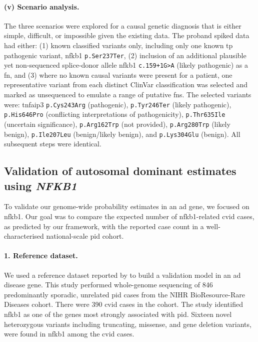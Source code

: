 \paragraph{(v) Scenario analysis.}
The three scenarios were explored for a causal genetic diagnosis that is either simple, difficult, or impossible given the existing data.
The proband spiked data had either:
(1) known classified variants only, including only one known \ac{tp} pathogenic variant, \ac{nfkb1}  \texttt{p.Ser237Ter}, 
(2) inclusion of an additional plausible yet non-sequenced splice‑donor allele \ac{nfkb1}  \texttt{c.159+1G{\small\textgreater}A} (likely pathogenic) as a \ac{fn}, and 
(3) where no known causal variants were present for a patient, one representative variant from each distinct ClinVar classification was selected and marked as unsequenced to emulate a range of putative \acp{fn}. The selected variants were: \ac{tnfaip3} \texttt{p.Cys243Arg} (pathogenic), \texttt{p.Tyr246Ter} (likely pathogenic), \texttt{p.His646Pro} (conflicting interpretations of pathogenicity), \texttt{p.Thr635Ile} (uncertain significance), \texttt{p.Arg162Trp} (not provided), \texttt{p.Arg280Trp} (likely benign), \texttt{p.Ile207Leu} (benign/likely benign), and \texttt{p.Lys304Glu} (benign). 
All subsequent steps were identical.

\subsection{Validation of autosomal dominant estimates using \textit{NFKB1}}

To validate our genome-wide probability estimates in an \ac{ad} gene, we focused on \ac{nfkb1}. 
Our goal was to compare the expected number of \ac{nfkb1}-related \ac{cvid} cases, as predicted by our framework, with the reported case count in a well-characterised national-scale \ac{pid} cohort.

\paragraph{1. Reference dataset.}
We used a reference dataset reported by \citet{tuijnenburgNFKB12018} to build a validation model in an \ac{ad} disease gene. This study performed whole-genome sequencing of 846 predominantly sporadic, unrelated \ac{pid} cases from the NIHR BioResource-Rare Diseases cohort. There were 390 \ac{cvid} cases in the cohort. The study identified \ac{nfkb1} as one of the genes most strongly associated with \ac{pid}. Sixteen novel heterozygous variants including truncating, missense, and gene deletion variants, were found in \ac{nfkb1} among the \ac{cvid} cases.

